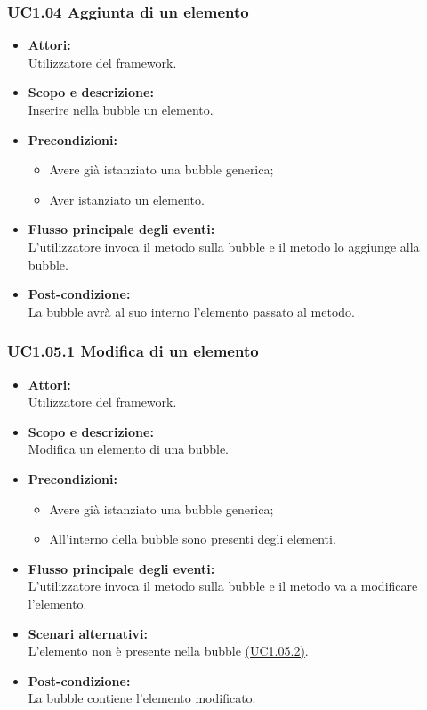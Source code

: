 \subsubsection{UC1.04 Aggiunta di un elemento} \label{UC1.04}

\begin{itemize}
	\item \textbf{Attori:}
	\\Utilizzatore del framework.
	\item \textbf{Scopo e descrizione:} 
	\\Inserire nella bubble un elemento.
	\item \textbf{Precondizioni:}
	\begin{itemize}
		\item Avere già istanziato una bubble generica;
		\item Aver istanziato un elemento.
	\end{itemize}
	\item \textbf{Flusso principale degli eventi:}
	\\L’utilizzatore invoca il metodo sulla bubble e il metodo lo aggiunge alla bubble.
	\item \textbf{Post-condizione:}
	\\La bubble avrà al suo interno l'elemento passato al metodo.
\end{itemize}

\subsubsection{UC1.05.1 Modifica di un elemento} \label{UC1.05.1}

\begin{itemize}
	\item \textbf{Attori:}
	\\Utilizzatore del framework.
	\item \textbf{Scopo e descrizione:} 
	\\Modifica un elemento di una bubble.
	\item \textbf{Precondizioni:}
	\begin{itemize}
		\item Avere già istanziato una bubble generica;
		\item All'interno della bubble sono presenti degli elementi.
	\end{itemize}
	\item \textbf{Flusso principale degli eventi:}
	\\L’utilizzatore invoca il metodo sulla bubble e il metodo va a modificare l’elemento.
	\item \textbf{Scenari alternativi:}
	\\ L’elemento non è presente nella bubble \hyperref[UC1.05.2]{(UC1.05.2)}.
	\item \textbf{Post-condizione:}
	\\La bubble contiene l’elemento modificato.
\end{itemize}

